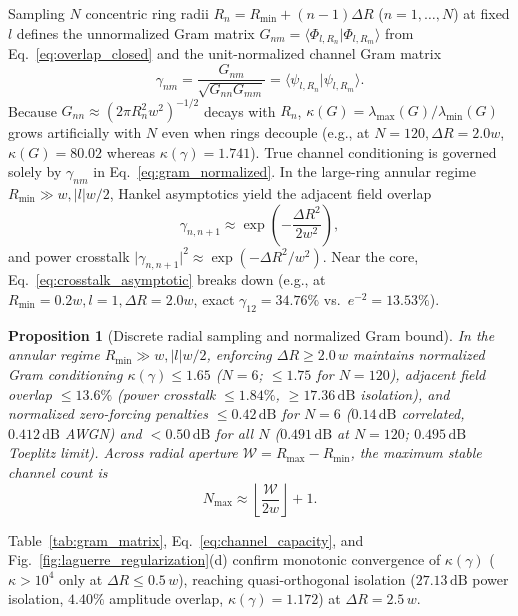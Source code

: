 \documentclass[aps,pra,onecolumn,notitlepage,11pt,tightenlines,amsmath,amssymb,floatfix,longbibliography]{revtex4-2}
\providecommand{\braket}[2]{\langle#1\vert#2\rangle}
\providecommand{\abs}[1]{\lvert#1\rvert}
\newtheorem{proposition}{Proposition}
\begin{document}
Sampling $N$ concentric ring radii $R_n = R_{\min} + (n-1)\Delta R$ ($n=1,\dots,N$) at fixed $l$ defines the unnormalized Gram matrix $G_{nm} = \braket{\Phi_{l,R_n}}{\Phi_{l,R_m}}$ from Eq.~\eqref{eq:overlap_closed} and the unit-normalized channel Gram matrix
\begin{equation}
\gamma_{nm} = \frac{G_{nm}}{\sqrt{G_{nn} G_{mm}}} = \braket{\psi_{l,R_n}}{\psi_{l,R_m}}.
\label{eq:gram_normalized}
\end{equation}
Because $G_{nn} \approx (2\pi R_n^2 w^2)^{-1/2}$ decays with $R_n$, $\kappa(G) = \lambda_{\max}(G)/\lambda_{\min}(G)$ grows artificially with $N$ even when rings decouple (e.g., at $N=120, \Delta R = 2.0w$, $\kappa(G) = 80.02$ whereas $\kappa(\gamma) = 1.741$). True channel conditioning is governed solely by $\gamma_{nm}$ in Eq.~\eqref{eq:gram_normalized}. In the large-ring annular regime $R_{\min} \gg w, \abs{l}w/2$, Hankel asymptotics yield the adjacent field overlap
\begin{equation}
\gamma_{n,n+1} \approx \exp\!\left(-\frac{\Delta R^2}{2w^2}\right),
\label{eq:crosstalk_asymptotic}
\end{equation}
and power crosstalk $\abs{\gamma_{n,n+1}}^2 \approx \exp(-\Delta R^2/w^2)$. Near the core, Eq.~\eqref{eq:crosstalk_asymptotic} breaks down (e.g., at $R_{\min} = 0.2w, l=1, \Delta R = 2.0w$, exact $\gamma_{12} = 34.76\%$ vs.\ $e^{-2} = 13.53\%$).

\begin{proposition}[Discrete radial sampling and normalized Gram bound]
\label{prop:channel_capacity}
In the annular regime $R_{\min} \gg w, \abs{l}w/2$, enforcing $\Delta R \ge 2.0\,w$ maintains normalized Gram conditioning $\kappa(\gamma) \le 1.65$ ($N=6$; $\le 1.75$ for $N=120$), adjacent field overlap $\le 13.6\%$ (power crosstalk $\le 1.84\%$, $\ge 17.36\,\mathrm{dB}$ isolation), and normalized zero-forcing penalties $\le 0.42\,\mathrm{dB}$ for $N=6$ ($0.14\,\mathrm{dB}$ correlated, $0.412\,\mathrm{dB}$ AWGN) and $< 0.50\,\mathrm{dB}$ for all $N$ ($0.491\,\mathrm{dB}$ at $N=120$; $0.495\,\mathrm{dB}$ Toeplitz limit). Across radial aperture $\mathcal{W} = R_{\max} - R_{\min}$, the maximum stable channel count is
\begin{equation}
N_{\max} \approx \left\lfloor \frac{\mathcal{W}}{2w} \right\rfloor + 1.
\label{eq:channel_capacity}
\end{equation}
\end{proposition}

Table~\ref{tab:gram_matrix}, Eq.~\eqref{eq:channel_capacity}, and Fig.~\ref{fig:laguerre_regularization}(d) confirm monotonic convergence of $\kappa(\gamma)$ ($\kappa > 10^4$ only at $\Delta R \le 0.5\,w$), reaching quasi-orthogonal isolation ($27.13\,\mathrm{dB}$ power isolation, $4.40\%$ amplitude overlap, $\kappa(\gamma) = 1.172$) at $\Delta R = 2.5\,w$.
\end{document}
